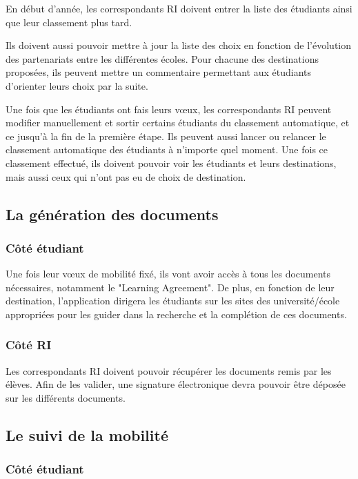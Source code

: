 \documentclass[10pt,a4paper]{article}
\begin{document}
		En début d'année, les correspondants RI doivent entrer la liste des étudiants ainsi que leur classement plus tard. 
		
		Ils doivent aussi pouvoir mettre à jour la liste des choix en fonction de l'évolution des partenariats entre les différentes écoles. Pour chacune des destinations proposées, ils peuvent mettre un commentaire permettant aux étudiants d'orienter leurs choix par la suite.
		
		Une fois que les étudiants ont fais leurs vœux, les correspondants RI peuvent modifier manuellement et sortir certains étudiants du classement automatique, et ce jusqu'à la fin de la première étape. Ils peuvent aussi lancer ou relancer le classement automatique des étudiants à n'importe quel moment. Une fois ce classement effectué, ils doivent pouvoir voir les étudiants et leurs destinations, mais aussi ceux qui n'ont pas eu de choix de destination.
		
		\subsection{La génération des documents}
		
		\subsubsection{Côté étudiant}
		
		Une fois leur vœux de mobilité fixé, ils vont avoir accès à tous les documents nécessaires, notamment le "Learning Agreement". De plus, en fonction de leur destination, l'application dirigera les étudiants sur les sites des université/école appropriées pour les guider dans la recherche et la complétion de ces documents. 
	
		\subsubsection{Côté RI}
		
		Les correspondants RI doivent pouvoir récupérer les documents remis par les élèves. Afin de les valider, une signature électronique devra pouvoir être déposée sur les différents documents. 
		
		\subsection{Le suivi de la mobilité}
		
		\subsubsection{Côté étudiant}
		
\end{document}
